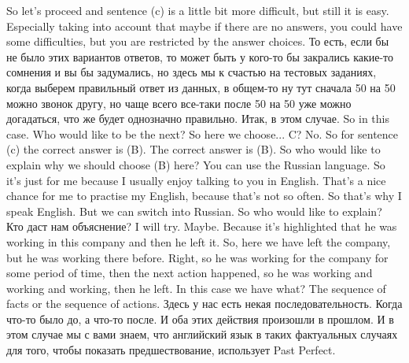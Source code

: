 \documentclass[main.tex]{subfiles}
\begin{document}
So let's proceed and sentence (c) is a little bit more difficult, but still it is easy.
Especially taking into account that maybe if there are no answers, you could have some difficulties, but you are restricted by the answer choices.
То есть, если бы не было этих вариантов ответов, то может быть у кого-то бы закрались какие-то сомнения и вы бы задумались, но здесь мы к счастью на тестовых заданиях, когда выберем правильный ответ из данных, в общем-то ну тут сначала 50 на 50 можно звонок другу, но чаще всего все-таки после 50 на 50 уже можно догадаться, что же будет однозначно правильно.
Итак, в этом случае.
So in this case.
Who would like to be the next?
So here we choose...
C?
No.
So for sentence (c) the correct answer is (B).
The correct answer is (B).
So who would like to explain why we should choose (B) here? You can use the Russian language.
So it's just for me because I usually enjoy talking to you in English.
That's a nice chance for me to practise my English, because that's not so often.
So that's why I speak English.
But we can switch into Russian.
So who would like to explain?
Кто даст нам объяснение?
I will try.
Maybe.
Because it's highlighted that he was working in this company and then he left it.
So, here we have left the company, but he was working there before.
Right, so he was working for the company for some period of time, then the next action happened, so he was working and working and working, then he left.
In this case we have what?
The sequence of facts or the sequence of actions.
Здесь у нас есть некая последовательность.
Когда что-то было до, а что-то после.
И оба этих действия произошли в прошлом.
И в этом случае мы с вами знаем, что английский язык в таких фактуальных случаях для того, чтобы показать предшествование, использует Past Perfect.
\end{document}
